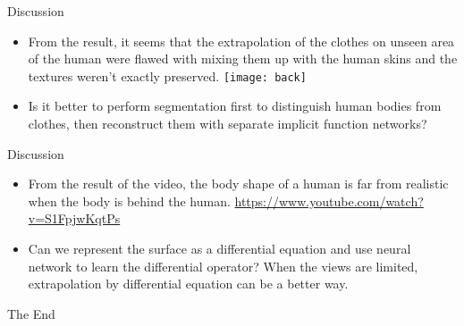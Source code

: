 \documentclass{beamer}
\begin{document}
	\begin{frame}{Discussion}
		\begin{itemize}
			\item From the result, it seems that the extrapolation of the clothes on unseen area of the human were flawed with mixing them up with the human skins and the textures weren't exactly preserved. 
			\texttt{[image: back]}
			\item Is it better to perform segmentation first to distinguish human bodies from clothes, then reconstruct them with separate implicit function networks?
		\end{itemize}
	\end{frame}

	\begin{frame}{Discussion}
		\begin{itemize}
			\item From the result of the video, the body shape of a human is far from realistic when the body is behind the human. \url{https://www.youtube.com/watch?v=S1FpjwKqtPs}
			\item Can we represent the surface as a differential equation and use neural network to learn the differential operator? When the views are limited, extrapolation by differential equation can be a better way.
		\end{itemize}
	\end{frame}

	\begin{frame}
		\huge{\centerline{The End}}
	\end{frame}
	
\end{document}
